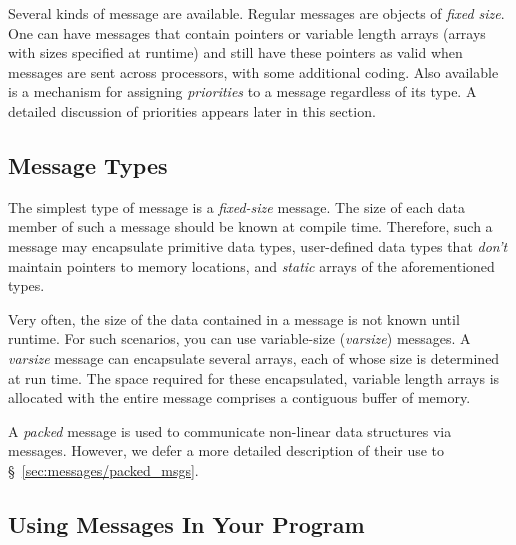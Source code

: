 
Several kinds of message are available.
Regular \charmpp{} messages are objects of
\textit{fixed size}. One can have messages that contain pointers or variable
length arrays (arrays with sizes specified at runtime) and still have these
pointers as valid when messages are sent across processors, with some
additional coding.  Also available is a mechanism for assigning
\textit{priorities} to a message regardless of its type.
A detailed discussion of priorities appears later in this section.

\subsection{Message Types}

\smallskip
{}
The simplest type of message is a {\em fixed-size} message. The size of each data member
of such a message should be known at compile time. Therefore, such a message may encapsulate
primitive data types, user-defined data types that {\em don't} maintain pointers to memory
locations, and {\em static} arrays of the aforementioned types. 

\smallskip
{}
Very often,
the size of the data contained in a message is not known until runtime. 
For such scenarios, you can use variable-size (\emph{varsize}) messages.
A {\em varsize} message can encapsulate several arrays,
each of whose size is determined at run time. 
The space required for these encapsulated, variable length arrays
is allocated with the entire message comprises a 
contiguous buffer of memory.

\smallskip
{} A {\em packed} message is used to communicate non-linear
data structures via messages. However, we defer a more detailed description of their use
to \S~\ref{sec:messages/packed_msgs}.

\subsection{Using Messages In Your Program}

